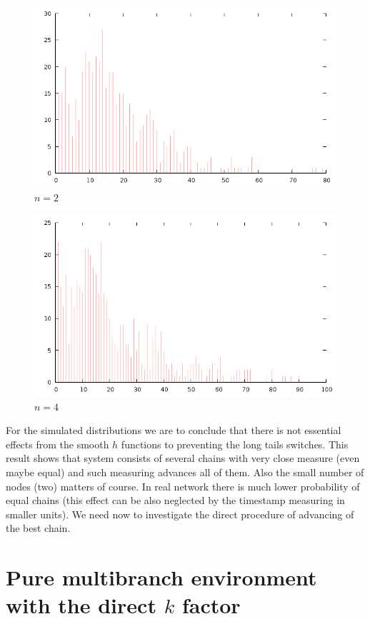 \documentclass[12pt]{article}
\begin{document}
\begin{figure}[H]
\centering
\caption{$n=2$}
\includegraphics[scale=0.6]{changes-n2k1.png}
\end{figure} 

\begin{figure}[H]
\centering
\caption{$n=4$}
\includegraphics[scale=0.6]{changes-n4k1.png}
\end{figure} 

For the simulated distributions we are to conclude that there is not essential effects from the smooth $h$ functions to
preventing the long tails switches. This result shows that system consists of several chains with very close measure (even
maybe equal) and such measuring advances all of them. Also the small number of nodes (two) matters of course. In real network
there is much lower probability of equal chains (this effect can be also neglected by the timestamp measuring in smaller units).
We need now to investigate the direct procedure of advancing of the best chain. 

\section{Pure multibranch environment with the direct $k$ factor}
\end{document}
